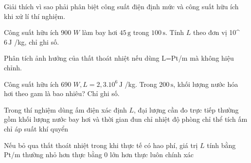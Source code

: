 \begin{bt}
Giải thích vì sao phải phân biệt công suất điện định mức và công suất hữu ích khi xử lí thí nghiệm.
\end{bt}

\begin{ex}
Công suất hữu ích 900 $W$ làm bay hơi $45\,\text{g}$ trong $100\,\text{s}$. Tính $L$ theo đơn vị 10^ $6\,\text{J}$ /kg, chỉ ghi số.
\end{ex}

\begin{bt}
Phân tích ảnh hưởng của thất thoát nhiệt nếu dùng L=Pt/m mà không hiệu chỉnh.
\end{bt}

\begin{ex}
Công suất hữu ích 690 $W, L=2,3.10^6\,\text{J}$ /kg. Trong $200\,\text{s}$, khối lượng nước hóa hơi theo gam là bao nhiêu? Chỉ ghi số.
\end{ex}

\begin{ex}
Trong thí nghiệm dùng ấm điện xác định $L$, đại lượng cần đo trực tiếp thường gồm
\choice
{\True khối lượng nước bay hơi và thời gian đun}
{chỉ nhiệt độ phòng}
{chỉ thể tích ấm}
{chỉ áp suất khí quyển}
\end{ex}

\begin{ex}
Nếu bỏ qua thất thoát nhiệt trong khi thực tế có hao phí, giá trị $L$ tính bằng Pt/m thường
\choice
{nhỏ hơn thực}
{bằng 0}
{\True lớn hơn thực}
{luôn chính xác}
\end{ex}

